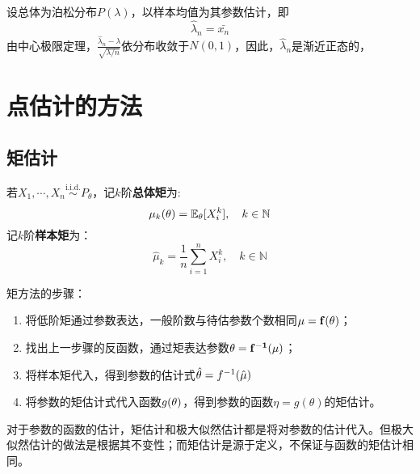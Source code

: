 \begin{example}
    设总体为泊松分布$P(\lambda)$，以样本均值为其参数估计，即
    \[ \hat\lambda_n=\bar{x_n} \]
    由中心极限定理，$\frac{\hat\lambda_n-\lambda}{\sqrt{\lambda/n}}$依分布收敛于$N(0,1)$，因此，$\hat\lambda_n$是渐近正态的，
\end{example}

\section{点估计的方法}

\subsection{矩估计}

\begin{definition}[总体矩与样本矩]
    若$X_1,\cdots ,X_n \overset{\text{i.i.d.}}{\sim} P_{\theta}$，记$k$阶\textbf{总体矩}为:
    \[ \mu_k(\theta) = \mathbb{E}_{\theta}[X_i^k] ,\quad k \in \mathbb{N} \]
    记$k$阶\textbf{样本矩}为：
    \[ \hat\mu_k=\frac1n \sum_{i=1}^n X_i^k ,\quad k \in \mathbb{N} \]
\end{definition}


矩方法的步骤：
\begin{enumerate}
    \item 将低阶矩通过参数表达，一般阶数与待估参数个数相同$\bf\mu=f(\bf\theta)$；
    \item 找出上一步骤的反函数，通过矩表达参数$\bf\theta=f^{-1}(\bf\mu)$；
    \item 将样本矩代入，得到参数的估计式$\hat{\theta}=f^{-1}(\hat{\bf\mu})$
    \item 将参数的矩估计式代入函数$g(\bf\theta)$，得到参数的函数$\eta = g(\theta)$的矩估计。
\end{enumerate}
\begin{remark}
    对于参数的函数的估计，矩估计和极大似然估计都是将对参数的估计代入。但极大似然估计的做法是根据其不变性；而矩估计是源于定义，不保证与函数的矩估计相同。
\end{remark}

